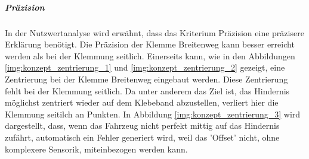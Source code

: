 \documentclass[../main.tex]{subfiles}
\begin{document}
        \begin{table}[H]
            \caption{Nutzwertanalyse Hindernis Aufnahme}
            \label{tab:konzept_nutzwertanalyse_aufnahme}
        \end{table}

        \newpage
            
            \subparagraph{Präzision}\label{a3:Präzision}

            In der Nutzwertanalyse wird erwähnt, dass das Kriterium Präzision eine präzisere Erklärung benötigt. Die Präzision der Klemme Breitenweg kann besser erreicht werden als bei der Klemmung seitlich. Einerseits kann, wie in den Abbildungen \ref{img:konzept_zentrierung_1} und \ref{img:konzept_zentrierung_2} gezeigt, eine Zentrierung bei der Klemme Breitenweg eingebaut werden. Diese Zentrierung fehlt bei der Klemmung seitlich. Da unter anderem das Ziel ist, das Hindernis möglichst zentriert wieder auf dem Klebeband abzustellen, verliert hier die Klemmung seitilch an Punkten. In Abbildung \ref{img:konzept_zentrierung_3} wird dargestellt, dass, wenn das Fahrzeug nicht perfekt mittig auf das Hindernis zufährt, automatisch ein Fehler generiert wird, weil das 'Offset' nicht, ohne komplexere Sensorik, miteinbezogen werden kann.
\end{document}
